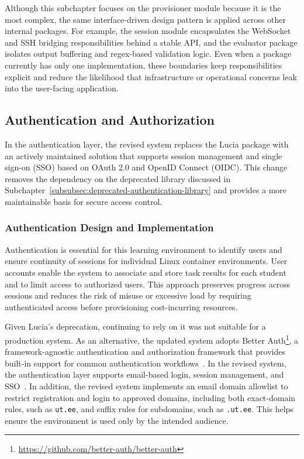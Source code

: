 Although this subchapter focuses on the provisioner module because it is the most complex, the same interface-driven design pattern is applied across other internal packages.
For example, the session module encapsulates the WebSocket and SSH bridging responsibilities behind a stable API, and the evaluator package isolates output buffering and regex-based validation logic.
Even when a package currently has only one implementation, these boundaries keep responsibilities explicit and reduce the likelihood that infrastructure or operational concerns leak into the user-facing application.

\subsection{Authentication and Authorization} \label{subsec:authentication-and-authorization}
In the authentication layer, the revised system replaces the Lucia package with an actively maintained solution that supports session management and single sign-on (SSO) based on OAuth 2.0 and OpenID Connect (OIDC).
This change removes the dependency on the deprecated library discussed in Subchapter~\ref{subsubsec:deprecated-authentication-library} and provides a more maintainable basis for secure access control.

\subsubsection{Authentication Design and Implementation} \label{subsubsec:authentication-design-and-implementation}
Authentication is essential for this learning environment to identify users and ensure continuity of sessions for individual Linux container environments.
User accounts enable the system to associate and store task results for each student and to limit access to authorized users.
This approach preserves progress across sessions and reduces the risk of misuse or excessive load by requiring authenticated access before provisioning cost-incurring resources.

Given Lucia's deprecation, continuing to rely on it was not suitable for a production system.
As an alternative, the updated system adopts Better Auth\footnote{\url{https://github.com/better-auth/better-auth}}, a framework-agnostic authentication and authorization framework that provides built-in support for common authentication workflows~\cite{better_auth_introduction}.
In the revised system, the authentication layer supports email-based login, session management, and SSO~\cite{better_auth_introduction}.
In addition, the revised system implements an email domain allowlist to restrict registration and login to approved domains, including both exact-domain rules, such as \texttt{ut.ee}, and suffix rules for subdomains, such as \texttt{.ut.ee}.
This helps ensure the environment is used only by the intended audience.

